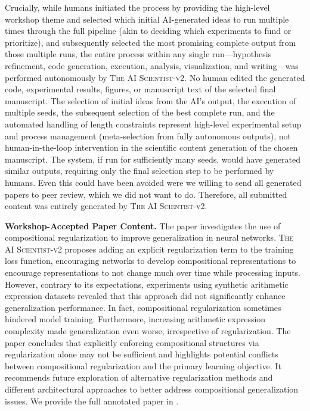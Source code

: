 \documentclass[11pt, a4paper]{include/gdm_format}
\newcommand{\ouralgo}{\textsc{The AI Scientist-v2}\xspace}
\begin{document}
Crucially, while humans initiated the process by providing the high-level workshop theme and selected which initial AI-generated ideas to run multiple times through the full pipeline (akin to deciding which experiments to fund or prioritize), and subsequently selected the most promising complete output from those multiple runs, the entire process within any single run---hypothesis refinement, code generation, execution, analysis, visualization, and writing---was performed autonomously by \ouralgo.
No human edited the generated code, experimental results, figures, or manuscript text of the selected final manuscript.
The selection of initial ideas from the AI's output, the execution of multiple seeds, the subsequent selection of the best complete run, and the automated handling of length constraints represent high-level experimental setup and process management (meta-selection from fully autonomous outputs), not human-in-the-loop intervention in the scientific content generation of the chosen manuscript.
The system, if run for sufficiently many seeds, would have generated similar outputs, requiring only the final selection step to be performed by humans. Even this could have been avoided were we willing to send all generated papers to peer review, which we did not want to do.
Therefore, all submitted content was entirely generated by \ouralgo.

\textbf{Workshop-Accepted Paper Content.}
The paper investigates the use of compositional regularization to improve generalization in neural networks. \ouralgo proposes adding an explicit regularization term to the training loss function, encouraging networks to develop compositional representations to encourage representations to not change much over time while processing inputs.
However, contrary to its expectations, experiments using synthetic arithmetic expression datasets revealed that this approach did not significantly enhance generalization performance. In fact, compositional regularization sometimes hindered model training. Furthermore, increasing arithmetic expression complexity made generalization even worse, irrespective of regularization. The paper concludes that explicitly enforcing compositional structures via regularization alone may not be sufficient and highlights potential conflicts between compositional regularization and the primary learning objective. It recommends future exploration of alternative regularization methods and different architectural approaches to better address compositional generalization issues. We provide the full annotated paper in .
\end{document}
